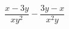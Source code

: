 \begin{ex}
	\begin{condition}
		\( \dfrac{x-3y}{xy^2}-\dfrac{3y-x}{x^2y} \)
	\end{condition}
\end{ex}